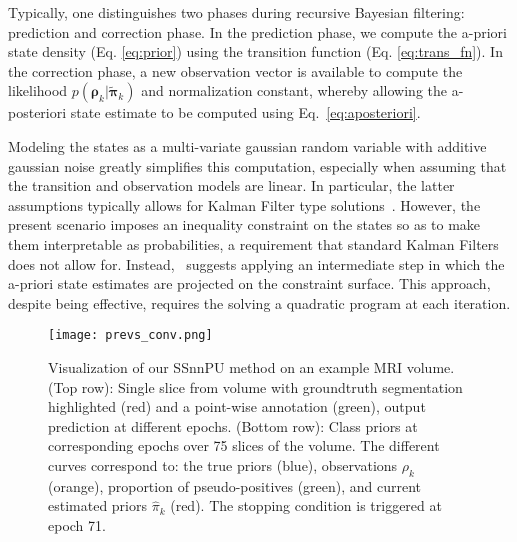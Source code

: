 

Typically, one distinguishes two phases during recursive Bayesian filtering: prediction and correction phase. In the prediction phase, we compute the a-priori state density (Eq. \ref{eq:prior}) using the transition function (Eq. \ref{eq:trans_fn}).
In the correction phase, a new observation vector is available to compute the likelihood $p(\bm{\rho}_{k}|\bm{\tilde\pi}_{k})$ and normalization constant, whereby allowing the a-posteriori state estimate to be computed using Eq.~\eqref{eq:aposteriori}.

Modeling the states as a multi-variate gaussian random variable with additive gaussian noise greatly simplifies this computation, especially when assuming that the transition and observation models are linear. In particular, the latter assumptions typically allows for Kalman Filter type solutions~\cite{kalman1960}. However, the present scenario imposes an inequality constraint on the states so as to make them interpretable as probabilities, a requirement that standard Kalman Filters does not allow for. Instead,~\cite{gupta07} suggests applying an intermediate step in which the a-priori state estimates are projected on the constraint surface. This approach, despite being effective, requires the solving a quadratic program at each iteration.
\begin{figure*}[t]
\caption{Visualization of our SSnnPU method on an example MRI volume. (Top row): Single slice from volume with groundtruth segmentation highlighted (red) and a point-wise annotation (green), output prediction at different epochs. (Bottom row): Class priors at corresponding epochs over 75 slices of the volume. The different curves correspond to: the true priors (blue), observations $\rho_{k}$ (orange), proportion of pseudo-positives (green), and current estimated priors $\hat\pi_{k}$ (red). The stopping condition is triggered at epoch 71.}
\centering
    \texttt{[image: prevs\_conv.png]}
\label{fig:prevs_conv}
\end{figure*}


